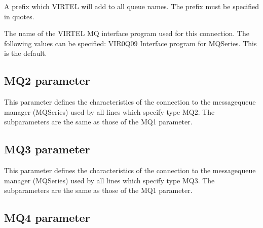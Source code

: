 \documentclass[letterpaper,10pt,english]{sphinxmanual}
\begin{document}
\sphinxAtStartPar
{} \sphinxhyphen{} A prefix which VIRTEL will add to all queue names. The prefix must be specified in quotes.

\sphinxAtStartPar
{} \sphinxhyphen{} The name of the VIRTEL MQ interface program used for this connection. The following values can be specified: VIR0Q09 Interface program for MQSeries. This is the default.


\subsection{MQ2 parameter}
\label{\detokenize{Installation_Guide:mq2-parameter}}
\begin{sphinxVerbatim}[commandchars=\\\{\}]
\PYG{p}{[}\PYG{p}{]}             
\end{sphinxVerbatim}

\sphinxAtStartPar
This parameter defines the characteristics of the connection to the message\sphinxhyphen{}queue manager (MQSeries) used by all lines which specify type MQ2. The subparameters are the same as those of the MQ1 parameter.


\subsection{MQ3 parameter}
\label{\detokenize{Installation_Guide:mq3-parameter}}
\begin{sphinxVerbatim}[commandchars=\\\{\}]
\PYG{p}{[}\PYG{p}{]}             
\end{sphinxVerbatim}

\sphinxAtStartPar
This parameter defines the characteristics of the connection to the message\sphinxhyphen{}queue manager (MQSeries) used by all lines which specify type MQ3. The subparameters are the same as those of the MQ1 parameter.


\subsection{MQ4 parameter}
\label{\detokenize{Installation_Guide:mq4-parameter}}
\begin{sphinxVerbatim}[commandchars=\\\{\}]
\PYG{p}{[}\PYG{p}{]}    
\end{sphinxVerbatim}
\end{document}
